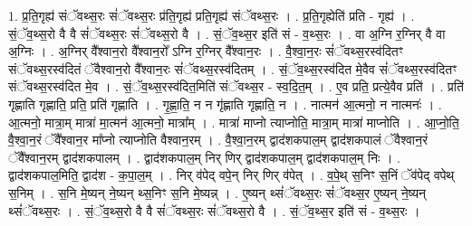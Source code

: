\documentclass[17pt]{extarticle}
\begin{document}
1. प्र॒ति॒गृह्य॑ संॅवथ्स॒रः सं॑ॅवथ्स॒रः प्र॑ति॒गृह्य॑ प्रति॒गृह्य॑ संॅवथ्स॒रः । . प्र॒ति॒गृह्येति॑ प्रति - गृह्य॑ । . सं॒ॅव॒थ्स॒रो वै वै सं॑ॅवथ्स॒रः सं॑ॅवथ्स॒रो वै । . सं॒ॅव॒थ्स॒र इति॑ सं - व॒थ्स॒रः । . वा अ॒ग्नि र॒ग्निर् वै वा अ॒ग्निः । . अ॒ग्निर् वै᳚श्वान॒रो वै᳚श्वान॒रो᳚ ऽग्नि र॒ग्निर् वै᳚श्वान॒रः । . वै॒श्वा॒न॒रः सं॑ॅवथ्स॒रस्व॑दितꣳ संॅवथ्स॒रस्व॑दितं ॅवैश्वान॒रो वै᳚श्वान॒रः सं॑ॅवथ्स॒रस्व॑दितम् । . सं॒ॅव॒थ्स॒रस्व॑दित मे॒वैव सं॑ॅवथ्स॒रस्व॑दितꣳ संॅवथ्स॒रस्व॑दित मे॒व । . सं॒ॅव॒थ्स॒रस्व॑दित॒मिति॑ संॅवथ्स॒र - स्व॒दि॒त॒म् । . ए॒व प्रति॒ प्रत्ये॒वैव प्रति॑ । . प्रति॑ गृह्णाति गृह्णाति॒ प्रति॒ प्रति॑ गृह्णाति । . गृ॒ह्णा॒ति॒ न न गृ॑ह्णाति गृह्णाति॒ न । . नात्मन॑ आ॒त्मनो॒ न नात्मनः॑ । . आ॒त्मनो॒ मात्रा॒म् मात्रा॑ मा॒त्मन॑ आ॒त्मनो॒ मात्रा᳚म् । . मात्रा॑ माप्नो त्याप्नोति॒ मात्रा॒म् मात्रा॑ माप्नोति । . आ॒प्नो॒ति॒ वै॒श्वा॒न॒रं ॅवै᳚श्वान॒र मा᳚प्नो त्याप्नोति वैश्वान॒रम् । . वै॒श्वा॒न॒रम् द्वाद॑शकपाल॒म् द्वाद॑शकपालं ॅवैश्वान॒रं ॅवै᳚श्वान॒रम् द्वाद॑शकपालम् । . द्वाद॑शकपाल॒म् निर् णिर् द्वाद॑शकपाल॒म् द्वाद॑शकपाल॒म् निः । . द्वाद॑शकपाल॒मिति॒ द्वाद॑श - क॒पा॒ल॒म् । . निर् व॑पेद् वपे॒न् निर् णिर् व॑पेत् । . व॒पे॒थ् स॒निꣳ स॒निं ॅव॑पेद् वपेथ् स॒निम् । . स॒नि मे॒ष्यन् ने॒ष्यन् थ्स॒निꣳ स॒नि मे॒ष्यन्न् । . ए॒ष्यन् थ्सं॑ॅवथ्स॒रः सं॑ॅवथ्स॒र ए॒ष्यन् ने॒ष्यन् थ्सं॑ॅवथ्स॒रः । . सं॒ॅव॒थ्स॒रो वै वै सं॑ॅवथ्स॒रः सं॑ॅवथ्स॒रो वै । . सं॒ॅव॒थ्स॒र इति॑ सं - व॒थ्स॒रः । \newline
\end{document}

